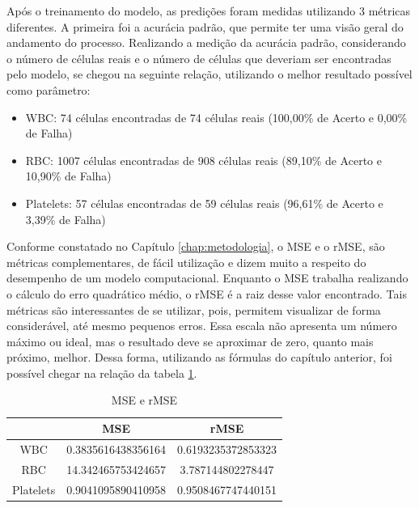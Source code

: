 Após o treinamento do modelo, as predições foram medidas utilizando 3 métricas diferentes. A primeira foi a acurácia padrão, que permite ter uma visão geral do andamento do processo. Realizando a medição da acurácia padrão, considerando o número de células reais e o número de células que deveriam ser encontradas pelo modelo, se chegou na seguinte relação, utilizando o melhor resultado possível como parâmetro:

\begin{itemize}
    \item WBC: 74 células encontradas de 74 células reais (100,00\% de Acerto e 0,00\% de Falha)
    \item RBC: 1007 células encontradas de 908 células reais (89,10\% de Acerto e 10,90\% de Falha)
    \item Platelets: 57 células encontradas de 59 células reais (96,61\% de Acerto e 3,39\% de Falha)
\end{itemize}

Conforme constatado no Capítulo \ref{chap:metodologia}, o MSE e o rMSE, são métricas complementares, de fácil utilização e dizem muito a respeito do desempenho de um modelo computacional. Enquanto o MSE trabalha realizando o cálculo do erro quadrático médio, o rMSE é a raiz desse valor encontrado. Tais métricas são interessantes de se utilizar, pois, permitem visualizar de forma considerável, até mesmo pequenos erros. Essa escala não apresenta um número máximo ou ideal, mas o resultado deve se aproximar de zero, quanto mais próximo, melhor. Dessa forma, utilizando as fórmulas do capítulo anterior, foi possível chegar na relação da tabela \ref{tbl:mse}.

\begin{table}[!htb]
	\centering
	\caption{MSE e rMSE}
	\label{tbl:mse}
	\begin{tabular}{|c|c|c|}
		\hline
		          & MSE                & rMSE               \\ \hline
		WBC       & 0.3835616438356164 & 0.6193235372853323 \\ \hline
		RBC       & 14.342465753424657 & 3.787144802278447  \\ \hline
		Platelets & 0.9041095890410958 & 0.9508467747440151 \\ \hline
	\end{tabular}
	\vspace{6pt}
\end{table}

